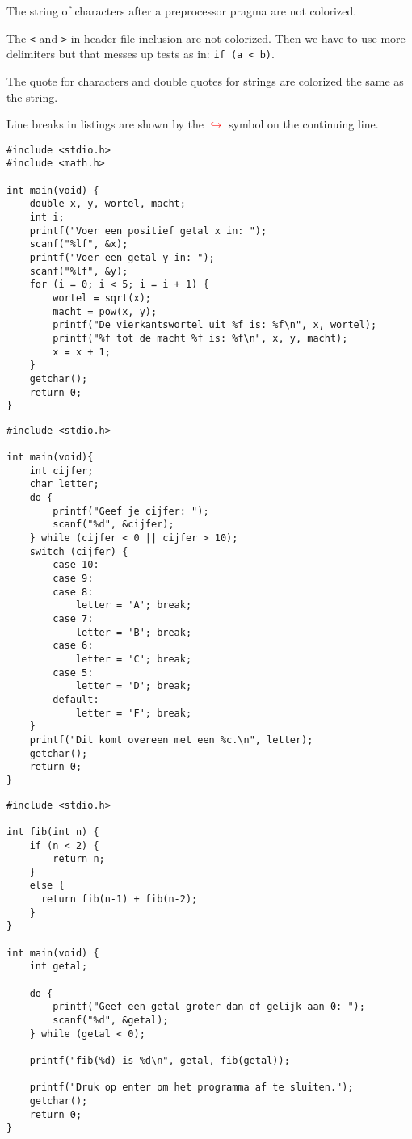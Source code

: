 \documentclass[a4paper,12pt]{article}
\begin{document}
The string of characters after a preprocessor pragma are not colorized.

The \lstinline|<| and \lstinline|>| in header file inclusion are not colorized. Then we have to use more delimiters but that messes up tests as in: \lstinline|if (a < b)|.

The quote for characters and double quotes for strings are colorized the same as the string.

Line breaks in listings are shown by the \textcolor{red}{$\hookrightarrow$} symbol on the continuing line.



\newpage

\begin{lstlisting}
#include <stdio.h>
#include <math.h>

int main(void) {
    double x, y, wortel, macht;
    int i;
    printf("Voer een positief getal x in: ");
    scanf("%lf", &x);
    printf("Voer een getal y in: ");
    scanf("%lf", &y);
    for (i = 0; i < 5; i = i + 1) {
        wortel = sqrt(x);
        macht = pow(x, y);
        printf("De vierkantswortel uit %f is: %f\n", x, wortel);
        printf("%f tot de macht %f is: %f\n", x, y, macht);
        x = x + 1;
    }
    getchar();
    return 0;
}
\end{lstlisting}

\newpage

\begin{lstlisting}
#include <stdio.h>

int main(void){
    int cijfer;
    char letter;
    do {
        printf("Geef je cijfer: ");
        scanf("%d", &cijfer);
    } while (cijfer < 0 || cijfer > 10);
    switch (cijfer) {
        case 10:
        case 9:
        case 8:
            letter = 'A'; break;
        case 7: 
            letter = 'B'; break;
        case 6: 
            letter = 'C'; break;
        case 5:
            letter = 'D'; break;
        default:
            letter = 'F'; break;
    }
    printf("Dit komt overeen met een %c.\n", letter);
    getchar();
    return 0;
}
\end{lstlisting}

\newpage

\begin{lstlisting}
#include <stdio.h>

int fib(int n) {
    if (n < 2) {
        return n;
	}
	else {
	  return fib(n-1) + fib(n-2);
	}
} 

int main(void) {
    int getal;

    do {
        printf("Geef een getal groter dan of gelijk aan 0: ");
        scanf("%d", &getal);
    } while (getal < 0);

    printf("fib(%d) is %d\n", getal, fib(getal));

    printf("Druk op enter om het programma af te sluiten.");
    getchar();
    return 0;
}
\end{lstlisting}
\end{document}
